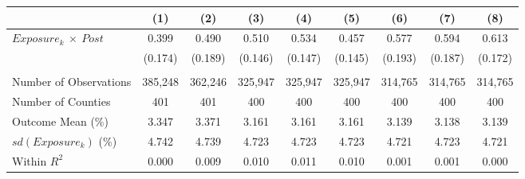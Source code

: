 \begin{tabular}{l*{1}cccccccc}
\toprule
& \multicolumn{1}{c}{(1)}
& \multicolumn{1}{c}{(2)}
& \multicolumn{1}{c}{(3)}
& \multicolumn{1}{c}{(4)}
& \multicolumn{1}{c}{(5)}
& \multicolumn{1}{c}{(6)}
& \multicolumn{1}{c}{(7)}
& \multicolumn{1}{c}{(8)}
\\ 



\midrule

$ Exposure_{k}\ \times \ Post $&       0.399\sym{**} &       0.490\sym{***}&       0.510\sym{***}&       0.534\sym{***}& 0.457\sym{***}&       0.577\sym{***}&       0.594\sym{***}&       0.613\sym{***}\\
           &     (0.174)         &     (0.189)         &     (0.146)         &     (0.147)         &     (0.145)         &     (0.193)         &     (0.187)         &     (0.172)         \\
\\
Number of Observations&     385,248         &     362,246         &     325,947         &     325,947         &     325,947         &     314,765         &     314,765         &     314,765         \\
Number of Counties&         401         &         401         &         400         &         400         &         400   &         400         &         400         &         400         \\
Outcome Mean (\%)&       3.347         &       3.371         &       3.161         &       3.161         &       3.161    &       3.139         &       3.138         &       3.139         \\
$ sd\left(Exposure_k\right) $ (\%)&       4.742         &       4.739         &       4.723         &       4.723         &       4.723         &       4.721         &       4.723         &       4.721         \\
Within $ R^2 $&       0.000         &       0.009         &       0.010         &       0.011         &       0.010       &       0.001         &       0.001         &       0.000         \\



\midrule


\end{tabular}
